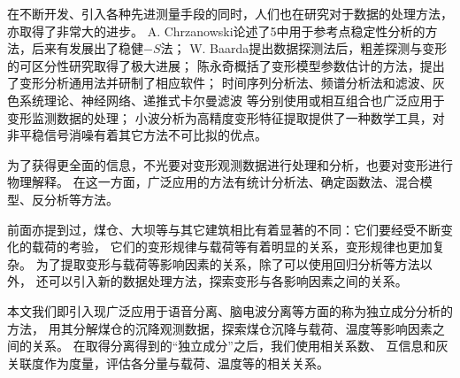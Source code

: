 在不断开发、引入各种先进测量手段的同时，人们也在研究对于数据的处理方法，亦取得了非常大的进步。
A. Chrzanowski论述了5中用于参考点稳定性分析的方法，后来有发展出了稳健$-S$法；
W. Baarda提出数据探测法后，粗差探测与变形的可区分性研究取得了极大进展；
陈永奇概括了变形模型参数估计的方法，提出了变形分析通用法并研制了相应软件；
时间序列分析法、频谱分析法和滤波、灰色系统理论、神经网络、递推式卡尔曼滤波
等分别使用或相互组合也广泛应用于变形监测数据的处理；
小波分析为高精度变形特征提取提供了一种数学工具，对非平稳信号消噪有着其它方法不可比拟的优点。

为了获得更全面的信息，不光要对变形观测数据进行处理和分析，也要对变形进行物理解释。
在这一方面，广泛应用的方法有统计分析法、确定函数法、混合模型、反分析等方法。

前面亦提到过，煤仓、大坝等与其它建筑相比有着显著的不同：它们要经受不断变化的载荷的考验，
它们的变形规律与载荷等有着明显的关系，变形规律也更加复杂。
为了提取变形与载荷等影响因素的关系，除了可以使用回归分析等方法以外，
还可以引入新的数据处理方法，探索变形与各影响因素之间的关系。

本文我们即引入现广泛应用于语音分离、脑电波分离等方面的称为独立成分分析的方法，
用其分解煤仓的沉降观测数据，探索煤仓沉降与载荷、温度等影响因素之间的关系。
在取得分离得到的“独立成分”之后，我们使用相关系数、
互信息和灰关联度作为度量，评估各分量与载荷、温度等的相关关系。
